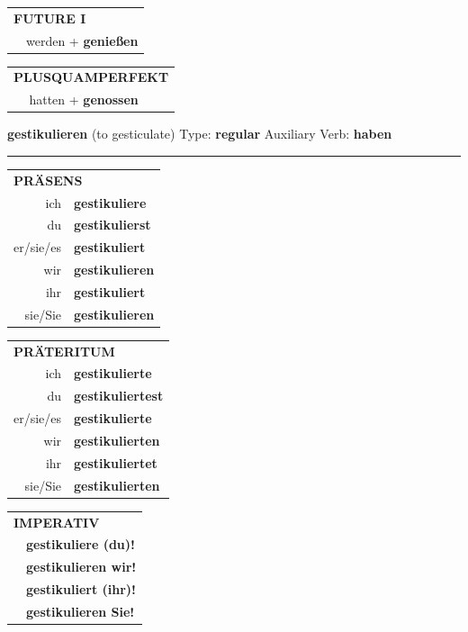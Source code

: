 \documentclass[10pt,a4paper]{revtex4-2}
\begin{document}
\begin{verbbox-acc}
\begin{tabular}{rl}
    \multicolumn{2}{l}{\textbf{FUTURE I} }\\
  &  werden + \textbf{genießen}\\
 
  \end{tabular}
\hfill
   \begin{tabular}{rl}
      \multicolumn{2}{l}{\textbf{PLUSQUAMPERFEKT}}\\
  &  hatten + \textbf{genossen}\\
  \end{tabular}
  
  \vspace{-5pt}


\end{verbbox-acc}

\begin{verbbox}
{\Large \bf gestikulieren} (to gesticulate) \hfill Type: \textbf{regular} \hfill Auxiliary Verb: \textbf{haben}

\vspace{5pt}
\hrule
\vspace{5pt}

\begin{tabular}{rl}
\multicolumn{2}{l}{\textbf{PRÄSENS}}\\
ich & \textbf{gestikuliere}\\
du & \textbf{gestikulierst}\\
er/sie/es & \textbf{gestikuliert}\\
wir & \textbf{gestikulieren}\\
ihr & \textbf{gestikuliert}\\
sie/Sie & \textbf{gestikulieren}\\
\end{tabular}
\hfill
\begin{tabular}{rl}
\multicolumn{2}{l}{\textbf{PRÄTERITUM}}\\
ich & \textbf{gestikulierte}\\
du & \textbf{gestikuliertest}\\
er/sie/es & \textbf{gestikulierte}\\
wir & \textbf{gestikulierten}\\
ihr & \textbf{gestikuliertet}\\
sie/Sie & \textbf{gestikulierten}\\
\end{tabular}
\hfill
\begin{tabular}{rl}
\multicolumn{2}{l}{\textbf{IMPERATIV}}\\
& \textbf{gestikuliere (du)!}\\
& \textbf{gestikulieren wir!}\\
& \textbf{gestikuliert (ihr)!}\\
& \textbf{gestikulieren Sie!}\\
\end{tabular}


\end{verbbox}
\end{document}
